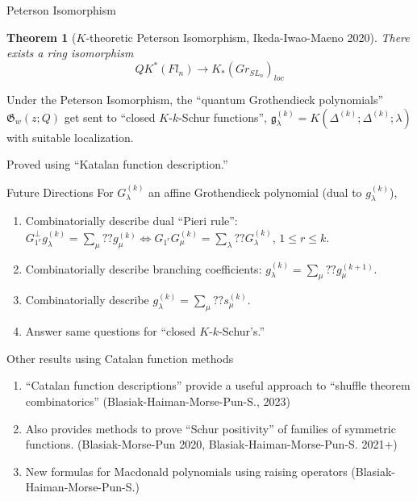 \documentclass{beamer}
\newtheorem{thm}{Theorem}
\theoremstyle{definition}
\begin{document}
\begin{frame}{Peterson Isomorphism}
  \begin{thm}[\(K\)-theoretic Peterson Isomorphism, Ikeda-Iwao-Maeno
    2020]
    There exists a ring isomorphism
    \[
      QK^*(Fl_n) \to K_*(Gr_{SL_n})_{loc}
    \]
  \end{thm}\pause
  \begin{theorem}
    Under the Peterson Isomorphism, the ``quantum Grothendieck polynomials'' \(\mathfrak{G}_w(z;Q)\)
    get sent to ``closed \(K\)-\(k\)-Schur functions'',
    \(\mathfrak{g}_\lambda^{(k)} =
    K(\Delta^{(k)};\Delta^{(k)};\lambda)\) with suitable localization.
  \end{theorem}\pause
  Proved using ``Katalan function description.''
\end{frame}
\begin{frame}{Future Directions}
    For \(G_\lambda^{(k)}\) an affine Grothendieck polynomial (dual to \(g_\lambda^{(k)}\)),\pause
    \begin{enumerate}
    \item Combinatorially describe dual ``Pieri rule'': \(G_{1^r}^\perp g_\lambda^{(k)} = \sum_\mu
      ?? g_\mu^{(k)} \iff G_{1^r} G_\mu^{(k)} = \sum_\lambda ?? G_\lambda^{(k)}\),  \(1 \leq r \leq k\).\pause
    \item Combinatorially describe branching coefficients: \(g_\lambda^{(k)} =
      \sum_\mu ?? g_\mu^{(k+1)}\).\pause
    \item Combinatorially describe \(g_\lambda^{(k)} = \sum_\mu ??
      s_\mu^{(k)}\).\pause
    \item Answer same questions for ``closed \(K\)-\(k\)-Schur’s.''
    \end{enumerate}
\end{frame}
\begin{frame}{Other results using Catalan function methods}
  \begin{enumerate}
  \item ``Catalan function descriptions'' provide a useful approach to
    ``shuffle theorem combinatorics'' (Blasiak-Haiman-Morse-Pun-S., 2023)\pause
  \item Also provides methods to prove ``Schur positivity'' of
    families of symmetric functions. (Blasiak-Morse-Pun 2020,
    Blasiak-Haiman-Morse-Pun-S. 2021+)\pause
  \item New formulas for Macdonald polynomials using raising operators
    (Blasiak-Haiman-Morse-Pun-S.)
  \end{enumerate}
\end{frame}
\end{document}
